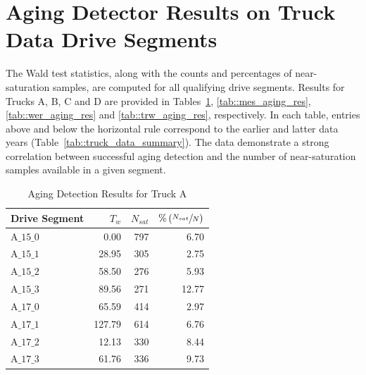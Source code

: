 \section{Aging Detector Results on Truck Data Drive Segments}
The Wald test statistics, along with the counts and percentages of near-saturation samples, are computed for all qualifying drive segments. Results for Trucks A, B, C and D are provided in Tables~\ref{tab::adt_aging_res}, \ref{tab::mes_aging_res}, \ref{tab::wer_aging_res} and \ref{tab::trw_aging_res}, respectively. In each table, entries above and below the horizontal rule correspond to the earlier and latter data years (Table~\ref{tab::truck_data_summary}). The data demonstrate a strong correlation between successful aging detection and the number of near-saturation samples available in a given segment.
\begin{table}[H]
        \centering
        \caption{Aging Detection Results for Truck A}
        \label{tab::adt_aging_res}
        \begin{tabular}{l r r r}
                \hline \hline
                Drive Segment & $T_w$  & $N_{sat}$ & $\% \left(  \sfrac{N_{sat}}{N}  \right)$ \\ \hline \hline
                A$\_15\_0$    & 0.00   & 797       & 6.70                           \\
                A$\_15\_1$    & 28.95  & 305       & 2.75                           \\
                A$\_15\_2$    & 58.50  & 276       & 5.93                           \\
                A$\_15\_3$    & 89.56  & 271       & 12.77                          \\ \hline
                A$\_17\_0$    & 65.59  & 414       & 2.97                           \\
                A$\_17\_1$    & 127.79 & 614       & 6.76                           \\
                A$\_17\_2$    & 12.13  & 330       & 8.44                           \\
                A$\_17\_3$    & 61.76  & 336       & 9.73                           \\
                \hline \hline
        \end{tabular}
\end{table}
